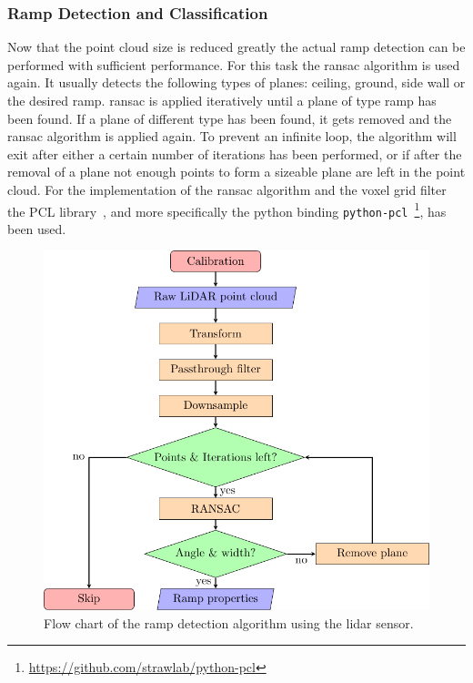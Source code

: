 \subsubsection{Ramp Detection and Classification}
\label{sssec:ramp_detecion_lidar}
Now that the point cloud size is reduced greatly the actual ramp detection can be performed with sufficient performance.
For this task the \gls{ransac} algorithm is used again.
It usually detects the following types of planes: ceiling, ground, side wall or the desired ramp.
\gls{ransac} is applied iteratively until a plane of type ramp has been found.
If a plane of different type has been found, it gets removed and the \gls{ransac} algorithm is applied again.
To prevent an infinite loop, the algorithm will exit after either a certain number of iterations has been performed, or if after the removal of a plane not enough points to form a sizeable plane are left in the point cloud.
For the implementation of the \gls{ransac} algorithm and the voxel grid filter the PCL library~\cite{Rusu2011}, and more specifically the python binding \texttt{python-pcl}~\footnote{\url{https://github.com/strawlab/python-pcl}}, has been used.
\begin{figure}[h]
    \centering
    \includegraphics{Graphics/TikZ/flowchart_lidar.pdf}
    \caption[Flow chart of the  algorithm]{Flow chart of the ramp detection algorithm using the \acrshort{lidar} sensor.}
    \label{fig:flowchart_lidar}
\end{figure}

